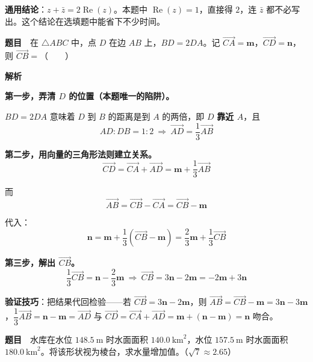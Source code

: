 \begin{gktip}
\textbf{通用结论}：$z+\bar z=2\operatorname{Re}(z)$。本题中 $\operatorname{Re}(z)=1$，直接得 $2$，连 $\bar z$ 都不必写出。这个结论在选填题中能省下不少时间。
\end{gktip}

\par\medskip


\textbf{题目}　在 $\triangle ABC$ 中，点 $D$ 在边 $AB$ 上，$BD=2DA$。记 $\overrightarrow{CA}=\boldsymbol m$，$\overrightarrow{CD}=\boldsymbol n$，则 $\overrightarrow{CB}=$（　　）

\textbf{解析}

\textbf{第一步，弄清 $D$ 的位置（本题唯一的陷阱）。}

$BD=2DA$ 意味着 $D$ 到 $B$ 的距离是到 $A$ 的两倍，即 $D$ \textbf{靠近 $A$}，且
\[AD:DB=1:2\ \Longrightarrow\ \overrightarrow{AD}=\frac13\overrightarrow{AB}\]

\textbf{第二步，用向量的三角形法则建立关系。}
\[\overrightarrow{CD}=\overrightarrow{CA}+\overrightarrow{AD}=\boldsymbol m+\frac13\overrightarrow{AB}\]

而
\[\overrightarrow{AB}=\overrightarrow{CB}-\overrightarrow{CA}=\overrightarrow{CB}-\boldsymbol m\]

代入：
\[\boldsymbol n=\boldsymbol m+\frac13\left(\overrightarrow{CB}-\boldsymbol m\right)=\frac23\boldsymbol m+\frac13\overrightarrow{CB}\]

\textbf{第三步，解出 $\overrightarrow{CB}$。}
\[\frac13\overrightarrow{CB}=\boldsymbol n-\frac23\boldsymbol m\ \Longrightarrow\ \overrightarrow{CB}=3\boldsymbol n-2\boldsymbol m=-2\boldsymbol m+3\boldsymbol n\]


\begin{gktip}
\textbf{验证技巧}：把结果代回检验——若 $\overrightarrow{CB}=3\boldsymbol n-2\boldsymbol m$，则 $\overrightarrow{AB}=\overrightarrow{CB}-\boldsymbol m=3\boldsymbol n-3\boldsymbol m$，$\dfrac13\overrightarrow{AB}=\boldsymbol n-\boldsymbol m=\overrightarrow{AD}$  与 $\overrightarrow{CD}=\overrightarrow{CA}+\overrightarrow{AD}=\boldsymbol m+(\boldsymbol n-\boldsymbol m)=\boldsymbol n$ 吻合。
\end{gktip}

\par\medskip


\textbf{题目}　水库在水位 $148.5\ \mathrm m$ 时水面面积 $140.0\ \mathrm{km}^{2}$，水位 $157.5\ \mathrm m$ 时水面面积 $180.0\ \mathrm{km}^{2}$。将该形状视为棱台，求水量增加值。（$\sqrt7\approx2.65$）

